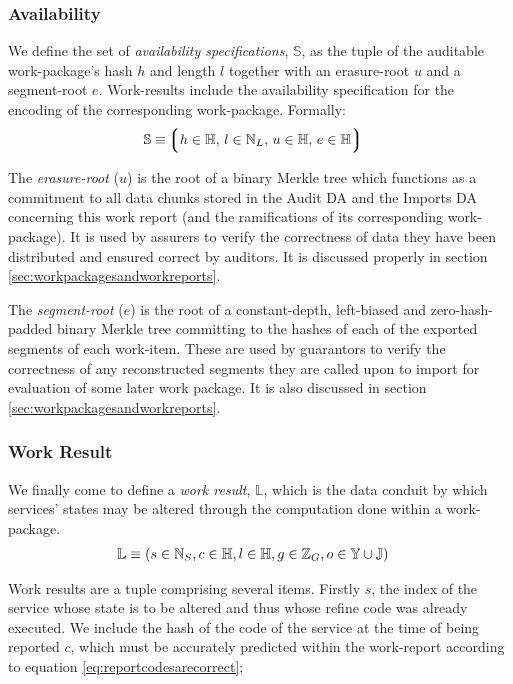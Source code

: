 \subsubsection{Availability}
We define the set of \emph{availability specifications}, $\mathbb{S}$, as the tuple of the auditable work-package's hash $h$ and length $l$ together with an erasure-root $u$ and a segment-root $e$. Work-results include the availability specification for the encoding of the corresponding work-package. Formally:
\begin{align}
  \mathbb{S} &\equiv \tuple{
    \isa{h}{\H}\ts
    \isa{l}{\N_L}\ts
    \isa{u}{\H}\ts
    \isa{e}{\H}
  }
\end{align}

The \emph{erasure-root} ($u$) is the root of a binary Merkle tree which functions as a commitment to all data chunks stored in the Audit DA and the Imports DA concerning this work report (and the ramifications of its corresponding work-package). It is used by assurers to verify the correctness of data they have been distributed and ensured correct by auditors. It is discussed properly in section \ref{sec:workpackagesandworkreports}.

The \emph{segment-root} ($e$) is the root of a constant-depth, left-biased and zero-hash-padded binary Merkle tree committing to the hashes of each of the exported segments of each work-item. These are used by guarantors to verify the correctness of any reconstructed segments they are called upon to import for evaluation of some later work package. It is also discussed in section \ref{sec:workpackagesandworkreports}.

\subsubsection{Work Result}
We finally come to define a \emph{work result}, $\mathbb{L}$, which is the data conduit by which services' states may be altered through the computation done within a work-package.
\begin{align}\label{eq:workresult}
  \mathbb{L} &\equiv (s \in \mathbb{N}_S, c \in \mathbb{H}, l \in \mathbb{H}, g \in \mathbb{Z}_G, o \in \mathbb{Y} \cup \mathbb{J})
\end{align}

Work results are a tuple comprising several items. Firstly $s$, the index of the service whose state is to be altered and thus whose refine code was already executed. We include the hash of the code of the service at the time of being reported $c$, which must be accurately predicted within the work-report according to equation \ref{eq:reportcodesarecorrect};

